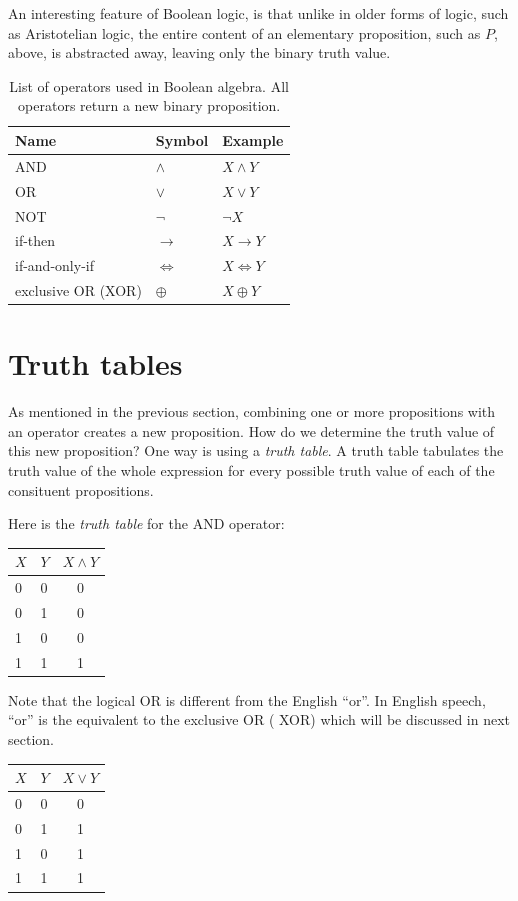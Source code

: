 \documentclass{article}
\begin{document}
An interesting feature of Boolean logic, is that unlike in older forms of logic,
such as Aristotelian logic, the entire content of an elementary proposition,
such as $P$, above, is abstracted away, leaving only the binary truth value.


\begin{table}
	\caption{List of operators used in Boolean algebra.
All operators return a new binary proposition.}
\begin{tabular}{lll}
	Name & Symbol & Example \\
	\hline
	AND & $\land$ & $X \land Y$ \\
	OR & $\lor$ & $X \lor Y$\\
	NOT & $\lnot$ & $\lnot X$ \\
	if-then & $\rightarrow$ & $X \rightarrow Y$ \\
	if-and-only-if & $\iff$ & $X \iff Y$ \\
	exclusive OR (XOR) & $\oplus$ & $X \oplus Y$ \\ 
	\hline
\end{tabular}
\end{table}

\section{Truth tables}

As mentioned in the previous section, combining one or more propositions with
an operator creates a new proposition.
How do we determine the truth value of this new proposition?
One way is using a {\it truth table}.
A truth table tabulates the truth value of the whole expression for every possible
truth value of each of the consituent propositions.

Here is the {\it truth table} for the AND operator:

\begin{tabular}{ll|c}
	$X$ & $Y$ & $X \land Y$ \\
	\hline
	0 & 0 & 0 \\
	0 & 1 & 0 \\
	1 & 0 & 0 \\
	1 & 1 & 1 \\
\end{tabular}

Note that the logical OR is different from the English ``or''.
In English speech, ``or'' is the equivalent to the exclusive OR (
XOR) which will be discussed in next section.

\begin{tabular}{ll|c}
	$X$ & $Y$ & $X \lor Y$ \\
	\hline
	0 & 0 & 0 \\
	0 & 1 & 1 \\
	1 & 0 & 1 \\
	1 & 1 & 1 \\
\end{tabular}
\end{document}
